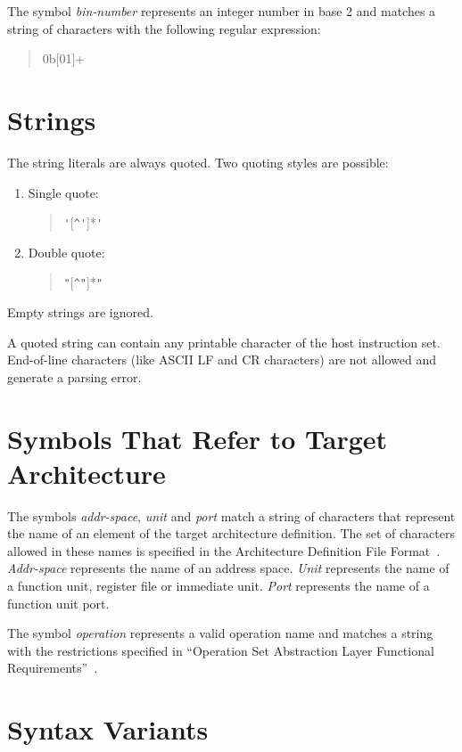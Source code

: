 \documentclass[twoside]{tce}
\begin{document}
The symbol \emph{bin-number} represents an integer number in base 2 and
matches a string of characters with the following regular expression:
\begin{quote}
  0b[01]+
\end{quote}

\section{Strings}
\label{sec:strings}

The string literals are always quoted. Two quoting styles are possible:
\begin{enumerate}
\item %
  Single quote:
  \begin{quote}
    \verb|'|[\verb|^'|]*\verb|'|
  \end{quote}
\item %
  Double quote:
  \begin{quote}
    \verb|"|[\verb|^"|]*\verb|"|
  \end{quote}
\end{enumerate}

Empty strings are ignored.
%

A quoted string can contain any printable character of the host instruction
set. End-of-line characters (like ASCII LF and CR characters) are not
allowed and generate a parsing error.

\section{Symbols That Refer to Target Architecture}

The symbols \emph{addr-space}, \emph{unit} and \emph{port} match a string of
characters that represent the name of an element of the target architecture
definition. The set of characters allowed in these names is specified in the
Architecture Definition File Format~\cite{ADF-specs}. \emph{Addr-space}
represents the name of an address space. \emph{Unit} represents the name of
a function unit, register file or immediate unit. \emph{Port} represents the
name of a function unit port.

The symbol \emph{operation} represents a valid operation name and matches a
string with the restrictions specified in ``Operation Set Abstraction Layer
Functional Requirements''~\cite{OSAL-specs}.

\section{Syntax Variants}
\end{document}

